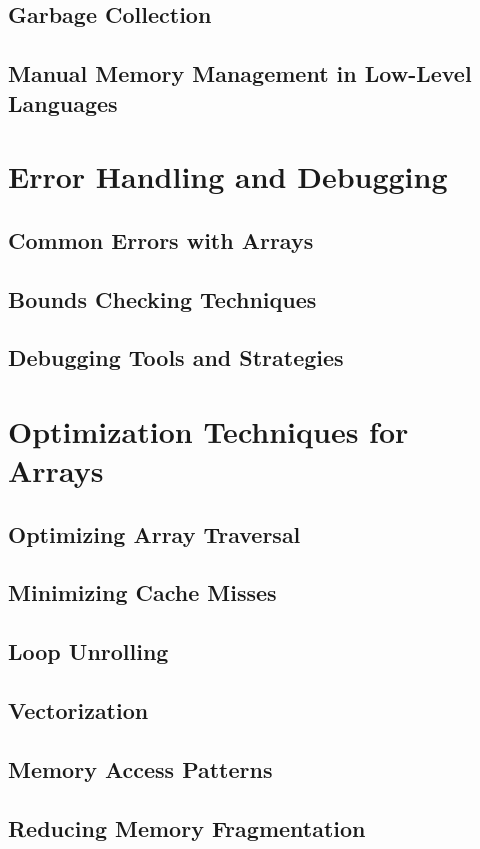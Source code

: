\documentclass[12pt, oneside]{book}
\begin{document}
\section{Garbage Collection}
\section{Manual Memory Management in Low-Level Languages}

\chapter{Error Handling and Debugging}
\section{Common Errors with Arrays}
\section{Bounds Checking Techniques}
\section{Debugging Tools and Strategies}

\chapter{Optimization Techniques for Arrays}
\section{Optimizing Array Traversal}
\section{Minimizing Cache Misses}
\section{Loop Unrolling}
\section{Vectorization}
\section{Memory Access Patterns}
\section{Reducing Memory Fragmentation}
\end{document}
